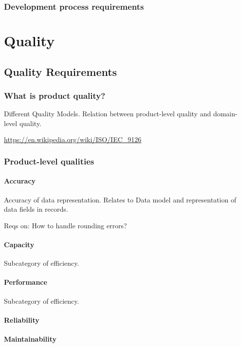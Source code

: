 \documentclass{reqengbook}
\begin{document}
\section{Development process requirements}


\part{Quality} %

\chapter{Quality Requirements}
\section{What is product quality?}
Different Quality Models. Relation between product-level quality and domain-level quality.

\url{https://en.wikipedia.org/wiki/ISO/IEC_9126}

\section{Product-level qualities}
\subsection{Accuracy}

Accuracy of data representation. Relates to Data model and  representation of data fields in records.

Reqs on: How to handle rounding errors?

\subsection{Capacity}
Subcategory of efficiency.

\subsection{Performance}
Subcategory of efficiency.

\subsection{Reliability}

\subsection{Maintainability}
\end{document}
